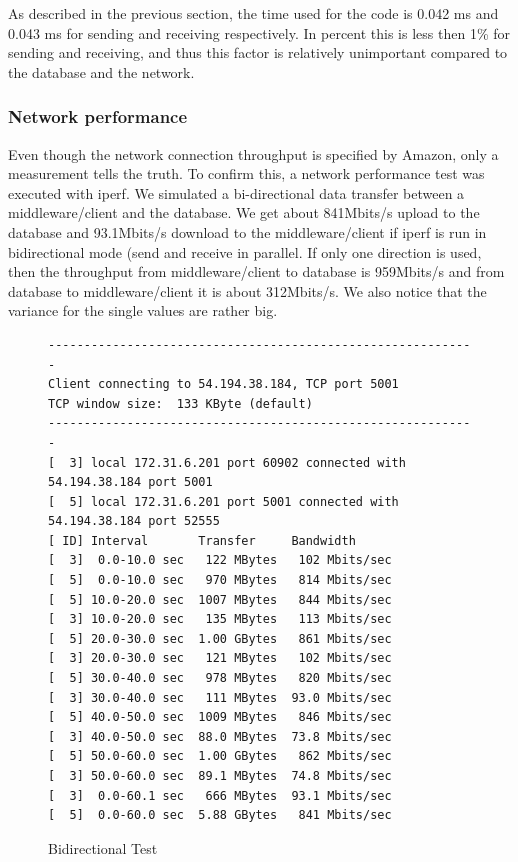 \documentclass[milestone1.tex]{subfiles}
\begin{document}
As described in the previous section, the time used for the code is 0.042 ms and 0.043 ms for sending and receiving respectively. In percent this is less then 1\% for sending and receiving, and thus this factor is relatively unimportant compared to the database and the network.

\subsubsection{Network performance}

Even though the network connection throughput is specified by Amazon, only a measurement tells the truth. To confirm this, a network performance test was executed with iperf. We simulated a bi-directional data transfer between a middleware/client and the database. We get about 841Mbits/s upload to the database and 93.1Mbits/s download to the middleware/client if iperf is run in bidirectional mode (send and receive in parallel. If only one direction is used, then the throughput from middleware/client to database is 959Mbits/s and from database to middleware/client it is about 312Mbits/s. We also notice that the variance for the single values are rather big.\\

\begin{figure}[H]
\begin{center}
\begin{verbatim}
------------------------------------------------------------
Client connecting to 54.194.38.184, TCP port 5001
TCP window size:  133 KByte (default)
------------------------------------------------------------
[  3] local 172.31.6.201 port 60902 connected with 54.194.38.184 port 5001
[  5] local 172.31.6.201 port 5001 connected with 54.194.38.184 port 52555
[ ID] Interval       Transfer     Bandwidth
[  3]  0.0-10.0 sec   122 MBytes   102 Mbits/sec
[  5]  0.0-10.0 sec   970 MBytes   814 Mbits/sec
[  5] 10.0-20.0 sec  1007 MBytes   844 Mbits/sec
[  3] 10.0-20.0 sec   135 MBytes   113 Mbits/sec
[  5] 20.0-30.0 sec  1.00 GBytes   861 Mbits/sec
[  3] 20.0-30.0 sec   121 MBytes   102 Mbits/sec
[  5] 30.0-40.0 sec   978 MBytes   820 Mbits/sec
[  3] 30.0-40.0 sec   111 MBytes  93.0 Mbits/sec
[  5] 40.0-50.0 sec  1009 MBytes   846 Mbits/sec
[  3] 40.0-50.0 sec  88.0 MBytes  73.8 Mbits/sec
[  5] 50.0-60.0 sec  1.00 GBytes   862 Mbits/sec
[  3] 50.0-60.0 sec  89.1 MBytes  74.8 Mbits/sec
[  3]  0.0-60.1 sec   666 MBytes  93.1 Mbits/sec
[  5]  0.0-60.0 sec  5.88 GBytes   841 Mbits/sec
\end{verbatim}
\end{center}
\caption{Bidirectional Test}
\label{fig:iperfclient}
\end{figure}
\end{document}
